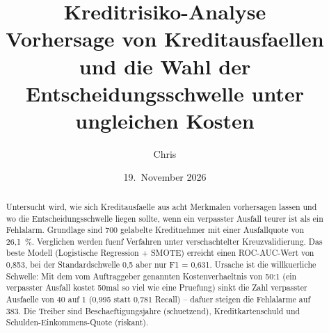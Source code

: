 \documentclass[11pt,a4paper]{article}
\title{Kreditrisiko-Analyse\\[0.4em]
\large Vorhersage von Kreditausfaellen und die Wahl der
Entscheidungsschwelle unter ungleichen Kosten}
\author{Chris}
\date{19.~November 2026}
\begin{document}
\maketitle
\thispagestyle{empty}

\begin{abstract}
\noindent
Untersucht wird, wie sich Kreditausfaelle aus acht Merkmalen vorhersagen lassen und wo die Entscheidungsschwelle liegen sollte, wenn ein verpasster Ausfall teurer ist als ein Fehlalarm. Grundlage sind 700 gelabelte Kreditnehmer mit einer Ausfallquote von 26,1~\%. Verglichen werden fuenf Verfahren unter verschachtelter Kreuzvalidierung. Das beste Modell (Logistische Regression + SMOTE) erreicht einen ROC-AUC-Wert von 0,853, bei der Standardschwelle 0,5 aber nur F1 = 0,631. Ursache ist die willkuerliche Schwelle: Mit dem vom Auftraggeber genannten Kostenverhaeltnis von 50:1 (ein verpasster Ausfall kostet 50mal so viel wie eine Pruefung) sinkt die Zahl verpasster Ausfaelle von 40 auf 1 (0,995 statt 0,781 Recall) -- dafuer steigen die Fehlalarme auf 383. Die Treiber sind Beschaeftigungsjahre (schuetzend), Kreditkartenschuld und Schulden-Einkommens-Quote (riskant).
\end{abstract}

\newpage
\tableofcontents
\newpage







\end{document}
